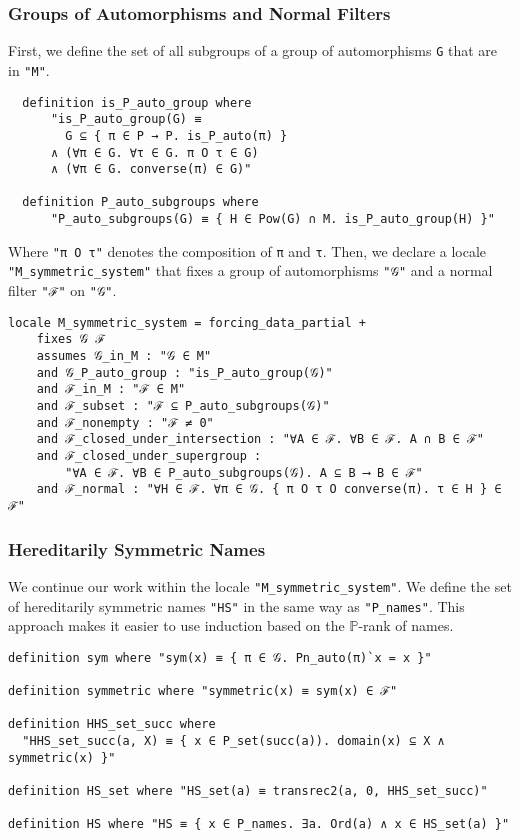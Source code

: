 \documentclass{report}
\newenvironment{isaframe}{\begin{mdframed}[topline=false, rightline=false, bottomline=false]}{\end{mdframed}}
\begin{document}
\subsubsection{Groups of Automorphisms and Normal Filters}
First, we define the set of all subgroups of a group of automorphisms \texttt{G} that are in \texttt{"M"}.
\begin{isaframe}
\begin{verbatim}
  definition is_P_auto_group where 
      "is_P_auto_group(G) ≡ 
        G ⊆ { π ∈ P → P. is_P_auto(π) } 
      ∧ (∀π ∈ G. ∀τ ∈ G. π O τ ∈ G) 
      ∧ (∀π ∈ G. converse(π) ∈ G)"   
  
  definition P_auto_subgroups where 
      "P_auto_subgroups(G) ≡ { H ∈ Pow(G) ∩ M. is_P_auto_group(H) }" 
\end{verbatim}
\end{isaframe}
Where \texttt{"π O τ"} denotes the composition of \texttt{π} and \texttt{τ}.
Then, we declare a locale \texttt{"M\_symmetric\_system"} that fixes a group of automorphisms \texttt{"𝒢"} and a normal filter \texttt{"ℱ"} on \texttt{"𝒢"}.
\begin{isaframe}
\begin{verbatim}
locale M_symmetric_system = forcing_data_partial + 
    fixes 𝒢 ℱ 
    assumes 𝒢_in_M : "𝒢 ∈ M"  
    and 𝒢_P_auto_group : "is_P_auto_group(𝒢)"   
    and ℱ_in_M : "ℱ ∈ M"
    and ℱ_subset : "ℱ ⊆ P_auto_subgroups(𝒢)" 
    and ℱ_nonempty : "ℱ ≠ 0" 
    and ℱ_closed_under_intersection : "∀A ∈ ℱ. ∀B ∈ ℱ. A ∩ B ∈ ℱ" 
    and ℱ_closed_under_supergroup : 
        "∀A ∈ ℱ. ∀B ∈ P_auto_subgroups(𝒢). A ⊆ B ⟶ B ∈ ℱ" 
    and ℱ_normal : "∀H ∈ ℱ. ∀π ∈ 𝒢. { π O τ O converse(π). τ ∈ H } ∈ ℱ" 
\end{verbatim}
\end{isaframe}

\subsubsection{Hereditarily Symmetric Names}
We continue our work within the locale \texttt{"M\_symmetric\_system"}.
We define the set of hereditarily symmetric names \texttt{"HS"} in the same way as \texttt{"P\_names"}.
This approach makes it easier to use induction based on the $\mathbb{P}$-rank of names.

\begin{isaframe}
\begin{verbatim}
definition sym where "sym(x) ≡ { π ∈ 𝒢. Pn_auto(π)`x = x }"  

definition symmetric where "symmetric(x) ≡ sym(x) ∈ ℱ"  

definition HHS_set_succ where 
  "HHS_set_succ(a, X) ≡ { x ∈ P_set(succ(a)). domain(x) ⊆ X ∧ symmetric(x) }" 

definition HS_set where "HS_set(a) ≡ transrec2(a, 0, HHS_set_succ)"

definition HS where "HS ≡ { x ∈ P_names. ∃a. Ord(a) ∧ x ∈ HS_set(a) }" 
\end{verbatim}
\end{isaframe}
\end{document}
